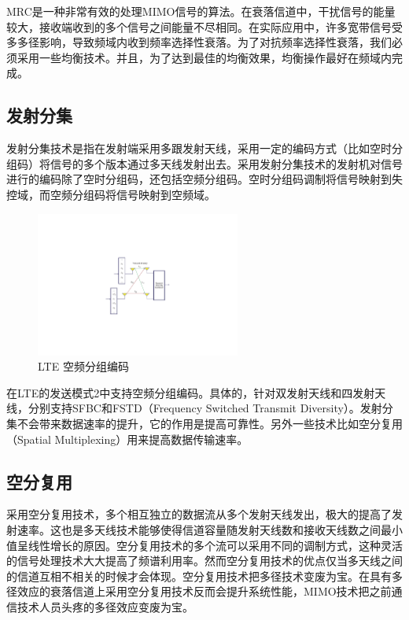 \documentclass[10pt,a4paper,UTF8]{article}
\begin{document}
MRC是一种非常有效的处理MIMO信号的算法。在衰落信道中，干扰信号的能量较大，接收端收到的多个信号之间能量不尽相同。在实际应用中，许多宽带信号受多多径影响，导致频域内收到频率选择性衰落。为了对抗频率选择性衰落，我们必须采用一些均衡技术。并且，为了达到最佳的均衡效果，均衡操作最好在频域内完成。
\subsection{发射分集}
\label{sec:orgheadline28}


发射分集技术是指在发射端采用多跟发射天线，采用一定的编码方式（比如空时分组码）将信号的多个版本通过多天线发射出去。采用发射分集技术的发射机对信号进行的编码除了空时分组码，还包括空频分组码。空时分组码调制将信号映射到失控域，而空频分组码将信号映射到空频域。

\begin{figure}[htb]
\centering
\includegraphics[width=0.6\textwidth]{../../img/20151105ltesfbc.pdf}
\caption{\label{fig:orgparagraph13}
LTE 空频分组编码}
\end{figure}

在LTE的发送模式2中支持空频分组编码。具体的，针对双发射天线和四发射天线，分别支持SFBC和FSTD（Frequency Switched Transmit Diversity）。发射分集不会带来数据速率的提升，它的作用是提高可靠性。另外一些技术比如空分复用（Spatial Multiplexing）用来提高数据传输速率。
\subsection{空分复用}
\label{sec:orgheadline29}


采用空分复用技术，多个相互独立的数据流从多个发射天线发出，极大的提高了发射速率。这也是多天线技术能够使得信道容量随发射天线数和接收天线数之间最小值呈线性增长的原因。空分复用技术的多个流可以采用不同的调制方式，这种灵活的信号处理技术大大提高了频谱利用率。然而空分复用技术的优点仅当多天线之间的信道互相不相关的时候才会体现。空分复用技术把多径技术变废为宝。在具有多径效应的衰落信道上采用空分复用技术反而会提升系统性能，MIMO技术把之前通信技术人员头疼的多径效应变废为宝。
\end{document}
